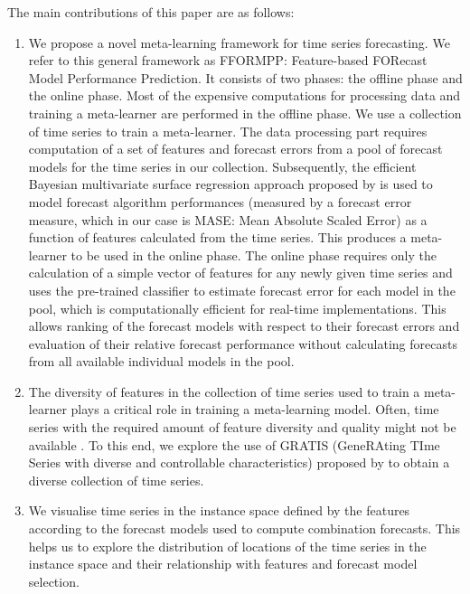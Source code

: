\documentclass[11pt,a4paper,]{article}
\begin{document}
The main contributions of this paper are as follows:

\begin{enumerate}
\def\labelenumi{\arabic{enumi}.}
\item
  We propose a novel meta-learning framework for time series forecasting. We refer to this general framework as FFORMPP: Feature-based FORecast Model Performance Prediction. It consists
  of two phases: the offline phase and the online phase. Most of the expensive computations for processing data and training a meta-learner are performed in the offline phase. We use a collection of time series to train a meta-learner. The data processing part requires computation of a set of features and forecast errors from a pool of forecast models for the time series in our collection. Subsequently, the efficient Bayesian multivariate surface regression approach proposed by \textcite{li2013efficient} is used to model forecast algorithm performances (measured by a forecast error measure, which in our case is MASE: Mean Absolute Scaled Error) as a function of features calculated from the time series. This produces a meta-learner to be used in the online phase. The online phase requires only the calculation of a simple vector of features for any newly given time series and uses the pre-trained classifier to estimate forecast error for each model in the pool, which is computationally efficient for real-time implementations. This allows ranking of the forecast models with respect to their forecast errors and evaluation of their relative forecast performance without calculating forecasts from all available individual models in the pool.
\item
  The diversity of features in the collection of time series used to train a meta-learner plays a critical role in training a meta-learning model. Often, time series with the required amount of feature diversity and quality might not be available \autocites{kang2017visualising}{kang2019gratis}. To this end, we explore the use of GRATIS (GeneRAting TIme Series with diverse and controllable characteristics) proposed by \textcite{kang2019gratis} to obtain a diverse collection of time series.
\item
  We visualise time series in the instance space defined by the features according to the forecast models used to compute combination forecasts. This helps us to explore the distribution of locations of the time series in the instance space and their relationship with features and forecast model selection.
\end{enumerate}
\end{document}
